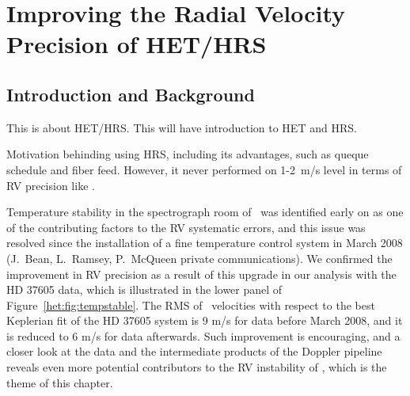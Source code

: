 \chapter{Improving the Radial Velocity Precision of HET/HRS}\label{chap:het}


\section{Introduction and Background}

This is about HET/HRS. This will have introduction to HET and HRS.

Motivation behinding using HRS, including its advantages, such as
queque schedule and fiber feed. However, it never performed on 1-2~m/s
level in terms of RV precision like \keck.

Temperature stability in the spectrograph room of \hrs\ was identified
early on as one of the contributing factors to the RV systematic
errors, and this issue was resolved since the installation of a fine
temperature control system in March 2008 (J.~Bean, L.~Ramsey,
P.~McQueen private communications). We confirmed the improvement in RV
precision as a result of this upgrade in our analysis with the HD
37605 data, which is illustrated in the lower panel of
Figure~\ref{het:fig:tempstable}. The RMS of \hrs\ velocities with
respect to the best Keplerian fit of the HD 37605 system is 9 m/s for
data before March 2008, and it is reduced to 6 m/s for data
afterwards. Such improvement is encouraging, and a closer look at the
data and the intermediate products of the Doppler pipeline reveals
even more potential contributors to the RV instability of \hrs, which
is the theme of this chapter.


